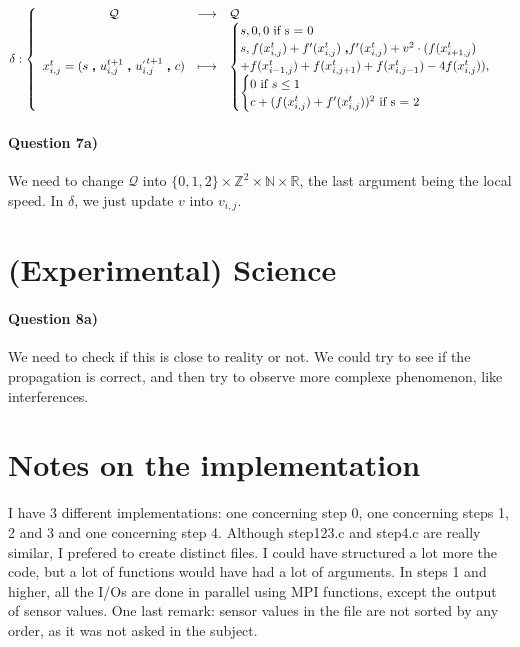 \documentclass[a4paper,12pt]{article}
\begin{document}
\begin{eqnarray*}
\delta : \left \{ \begin{array}{c c l }
  \mathcal{Q} & \longrightarrow & \mathcal{Q} \\
  x_{i,j}^t = (s \ \pmb{,} \ u^{t+1}_{i,j}\ \pmb{,} \ u^{_{'} t+1}_{i,j} \ \pmb{,} \ c) & \longmapsto &
  \begin{cases}s, 0, 0\mbox{ if s = 0}\\
    s, f(x^{t}_{i,j}) + f'(x^t_{i,j})\ \pmb{,} f'(x^t_{i,j}) + v^2 \cdot (f(x^t_{i+1,j}) \\+ f(x^t_{i-1, j}) + f(x^t_{i, j+1}) + f(x^t_{i, j-1}) - 4 f(x^t_{i, j})),\\
    \begin{cases} 0 \mbox{ if }s \leq 1\\
      c + (f(x^{t}_{i,j}) + f'(x^t_{i,j}))^2 \mbox{ if s = 2} \\
    \end{cases}
  \end{cases}
  \end{array} \right .
\end{eqnarray*}


\paragraph{Question 7a)} We need to change $\mathcal{Q}$ into $\{0,1,2\} \times \mathbb{Z}^2 \times \mathbb{N} \times \mathbb{R}$, the last argument being the local speed. In $\delta$, we just update $v$ into $v_{i,j}$.


\section{(Experimental) Science}

\paragraph{Question 8a)} We need to check if this is close to reality or not. We could try to see if the propagation is correct, and then try to observe more complexe phenomenon, like interferences.

\section{Notes on the implementation}

I have 3 different implementations: one concerning step 0, one concerning steps 1, 2 and 3 and one concerning step 4. Although step123.c and step4.c are really similar, I prefered to create distinct files. I could have structured a lot more the code, but a lot of functions would have had a lot of arguments. In steps 1 and higher, all the I/Os are done in parallel using MPI functions, except the output of sensor values. One last remark: sensor values in the file are not sorted by any order, as it was not asked in the subject.
\end{document}
